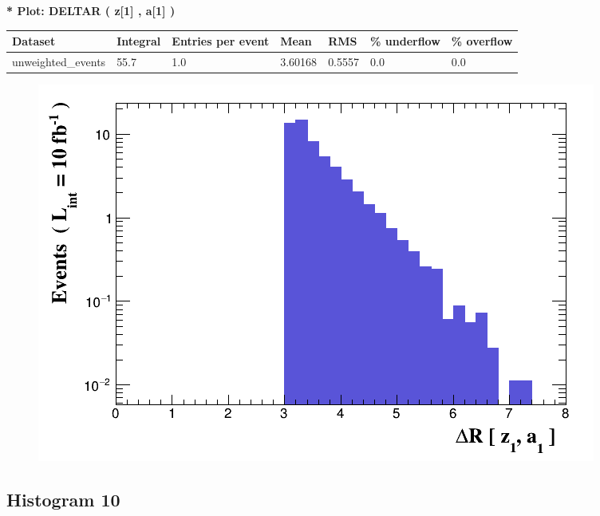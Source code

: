 \documentclass[a4paper, 10pt]{article}
\begin{document}
\textbf{* Plot: DELTAR ( z[1] , a[1] ) }\\
   \begin{table}[H]
  \begin{center}
    \begin{tabular}{|m{23.0mm}|m{23.0mm}|m{18.0mm}|m{19.0mm}|m{19.0mm}|m{19.0mm}|m{19.0mm}|}
      \hline
      {\cellcolor{yellow}         Dataset}& {\cellcolor{yellow}         Integral}& {\cellcolor{yellow}         Entries per event}& {\cellcolor{yellow}         Mean}& {\cellcolor{yellow}         RMS}& {\cellcolor{yellow}         \% underflow}& {\cellcolor{yellow}         \% overflow}\\
      \hline
      {\cellcolor{white}         unweighted\_events}& {\cellcolor{white}         55.7}& {\cellcolor{white}         1.0}& {\cellcolor{white}         3.60168}& {\cellcolor{white}         0.5557}& {\cellcolor{green}         0.0}& {\cellcolor{green}         0.0}\\
\hline
    \end{tabular}
  \end{center}
\end{table}

\begin{figure}[H]
  \begin{center}
    \includegraphics[scale=0.45]{selection_8.png}\\
\caption{   }
  \end{center}
\end{figure}
      \newpage
\subsection{ Histogram 10}
\end{document}
